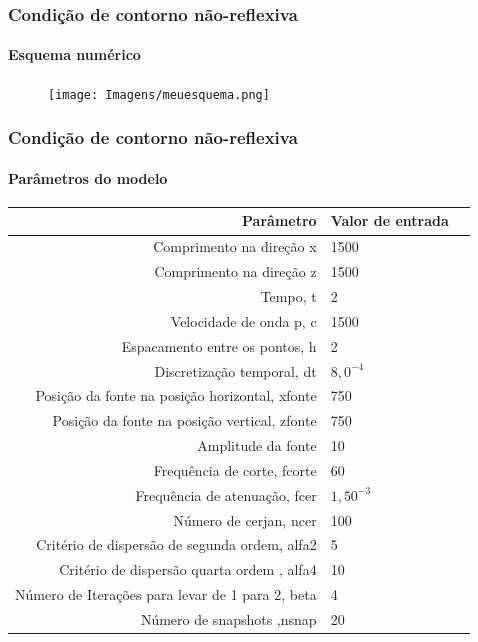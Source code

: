 \documentclass[10pt]{beamer} %
\begin{document}
\begin{frame}
	\frametitle{Condição de contorno não-reflexiva}
	\framesubtitle{Esquema numérico}
	\begin{block}{}
		\begin{figure}[H]
			\centering
			\texttt{[image: Imagens/meuesquema.png]}
		\end{figure}
		
	\end{block}
\end{frame}

\begin{frame}
	\frametitle{Condição de contorno não-reflexiva}
	\framesubtitle{Parâmetros do modelo}
	\begin{block}{}
\begin{table}[h]
	\centering
	\begin{tabular}{r|lr}
		
		Par{\^a}metro & Valor de entrada \\ %
		\hline                               %
		 Comprimento na direção x         &  1500 \\
		Comprimento na direção z         &  1500 \\
		Tempo, t            & 2 \\
		Velocidade de onda p, c      & 1500 \\
	    Espacamento entre os pontos, h & 2           \\
		 Discretização temporal, dt&  $8,0^{-4}$ \\
		 Posição da fonte na posição horizontal, xfonte& 750 \\
		 Posição da fonte na posição vertical, zfonte& 750 \\
		 Amplitude da fonte& 10 \\
		 Frequência de corte, fcorte& 60 \\
		 Frequência de atenuação, fcer & $1,50^{-3}$\\
		 Número de cerjan, ncer& 100 \\
		 Critério de dispersão de segunda ordem, alfa2& 5\\
		 Critério de dispersão quarta ordem , alfa4&10\\
		Número de Iterações para levar de 1 para 2, beta&4\\
		Número de snapshots ,nsnap &  20 %
		
	\end{tabular}
\end{table}
		
	\end{block}
\end{frame}
\end{document}
